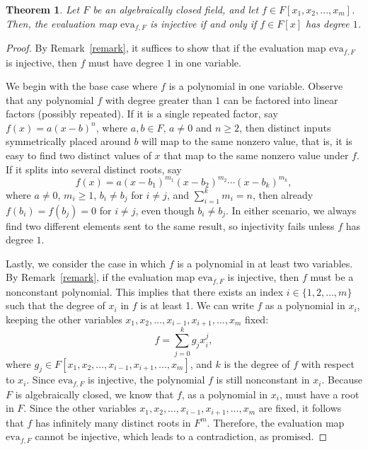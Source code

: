 \documentclass{amsart}
\newtheorem{theorem}{Theorem}[section]
\theoremstyle{definition}
\begin{document}
	\begin{theorem}\label{al1}
		Let \( F \) be an algebraically closed field, and let $f\in F[x_1,x_2,\ldots,x_m]$. Then, the evaluation map \( \mathrm{eva}_{f, F} \) is injective if and only if $f\in F[x]$ has degree $1$.
	\end{theorem}
	
	\begin{proof}
		By Remark~\ref{remark}, it suffices to show that if the evaluation map \( \mathrm{eva}_{f, F} \) is injective, then $f$ must have degree $1$ in one variable.  
		
		We begin with the base case where $f$ is a polynomial in one variable. Observe that any polynomial $f$ with degree greater than $1$ can be factored into linear factors (possibly repeated). If it is a single repeated factor, say $f(x) = a(x - b)^n$, where $a,b\in F$, $a \ne 0$ and $n\geq2$, then distinct inputs symmetrically placed around $b$ will map to the same nonzero value, that is, it is easy to find two distinct values of $x$ that map to the same nonzero value under $f$. If it splits into several distinct roots, say $$f(x)=a(x-b_1)^{m_1}(x-b_2)^{m_2}\cdots(x-b_k)^{m_k},$$ where $a \ne 0$, $m_i \ge 1$, $b_i \ne b_j$ for $i \ne j$, and $\displaystyle\sum_{i=1}^k m_i = n$, then  already $f(b_i) = f(b_j) = 0$ for $i \ne j$,  even though $b_i \ne b_j$. In either scenario, we always find two different elements sent to the same result, so injectivity fails unless $f$ has degree $1$.
		
		Lastly, we consider the case in which $f$ is a polynomial in at least two variables.  By Remark~\ref{remark}, if the evaluation map \( \mathrm{eva}_{f,F} \) is injective, then \( f \) must be a nonconstant polynomial. This implies that there exists an index \( i \in \{1, 2, \ldots, m\} \) such that the degree of \( x_i \) in \( f \) is at least 1. We can write \( f \) as a polynomial in \( x_i \), keeping the other variables \( x_1, x_2, \ldots, x_{i-1}, x_{i+1}, \ldots, x_m \) fixed: 
		$$f = \sum_{j=0}^k g_j x_i^j,$$
		where \( g_j \in F[x_1, x_2, \ldots, x_{i-1}, x_{i+1}, \ldots, x_m] \), and \( k \) is the degree of \( f \) with respect to \( x_i \). Since \( \mathrm{eva}_{f,F} \) is injective, the polynomial \( f \) is still nonconstant in \( x_i \). Because \( F \) is algebraically closed, we know that \( f \), as a polynomial in \( x_i \), must have a root in \( F \). Since the other variables \( x_1, x_2, \ldots, x_{i-1}, x_{i+1}, \ldots, x_m \) are fixed, it follows that \( f \) has infinitely many distinct roots in \( F^m \). Therefore, the evaluation map \( \mathrm{eva}_{f,F} \) cannot be injective, which leads to a contradiction, as promised.
	\end{proof}
	
\end{document}
